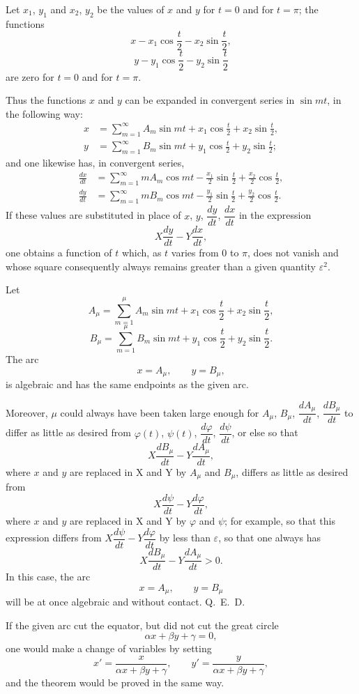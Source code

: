 \documentclass[11pt]{article}
\begin{document}
Let $x_1$, $y_1$ and $x_2$, $y_2$ be the values of $x$ and $y$ for $t=0$ and for $t=\pi$; the functions
\[
x-x_1\cos\frac t2-x_2\sin\frac t2,
\]
\[
y-y_1\cos\frac t2-y_2\sin\frac t2
\]
are zero for $t=0$ and for $t=\pi$.

Thus the functions $x$ and $y$ can be expanded in convergent series in $\sin mt$, in the following way:
\[
\begin{aligned}
x&=\sum_{m=1}^{\infty}A_m\sin mt+x_1\cos\frac t2+x_2\sin\frac t2,\\
y&=\sum_{m=1}^{\infty}B_m\sin mt+y_1\cos\frac t2+y_2\sin\frac t2;
\end{aligned}
\]
and one likewise has, in convergent series,
\[
\begin{aligned}
\frac{dx}{dt}&=\sum_{m=1}^{\infty}mA_m\cos mt-\frac{x_1}{2}\sin\frac t2+\frac{x_2}{2}\cos\frac t2,\\
\frac{dy}{dt}&=\sum_{m=1}^{\infty}mB_m\cos mt-\frac{y_1}{2}\sin\frac t2+\frac{y_2}{2}\cos\frac t2.
\end{aligned}
\]
If these values are substituted in place of $x$, $y$, $\dfrac{dy}{dt}$, $\dfrac{dx}{dt}$ in the expression
\[
X\frac{dy}{dt}-Y\frac{dx}{dt},
\]
one obtains a function of $t$ which, as $t$ varies from $0$ to $\pi$, does not vanish and whose square consequently always remains greater than a given quantity $\varepsilon^2$.

Let
\[
A_\mu=\sum_{m=1}^{\mu}A_m\sin mt+x_1\cos\frac t2+x_2\sin\frac t2,
\]
\[
B_\mu=\sum_{m=1}^{\mu}B_m\sin mt+y_1\cos\frac t2+y_2\sin\frac t2.
\]
The arc
\[
x=A_\mu,
\qquad
 y=B_\mu,
\]
is algebraic and has the same endpoints as the given arc.

Moreover, $\mu$ could always have been taken large enough for $A_\mu$, $B_\mu$, $\dfrac{dA_\mu}{dt}$, $\dfrac{dB_\mu}{dt}$ to differ as little as desired from $\varphi(t)$, $\psi(t)$, $\dfrac{d\varphi}{dt}$, $\dfrac{d\psi}{dt}$, or else so that
\[
X\frac{dB_\mu}{dt}-Y\frac{dA_\mu}{dt},
\]
where $x$ and $y$ are replaced in X and Y by $A_\mu$ and $B_\mu$, differs as little as desired from
\[
X\frac{d\psi}{dt}-Y\frac{d\varphi}{dt},
\]
where $x$ and $y$ are replaced in X and Y by $\varphi$ and $\psi$; for example, so that this expression differs from $X\dfrac{d\psi}{dt}-Y\dfrac{d\varphi}{dt}$ by less than $\varepsilon$, so that one always has
\[
X\frac{dB_\mu}{dt}-Y\frac{dA_\mu}{dt}>0.
\]
In this case, the arc
\[
x=A_\mu,
\qquad
 y=B_\mu
\]
will be at once algebraic and without contact. \hfill\mbox{Q. E. D.}

If the given arc cut the equator, but did not cut the great circle
\[
\alpha x+\beta y+\gamma=0,
\]
one would make a change of variables by setting
\[
x'=\frac{x}{\alpha x+\beta y+\gamma},
\qquad
 y'=\frac{y}{\alpha x+\beta y+\gamma},
\]
and the theorem would be proved in the same way.
\end{document}
